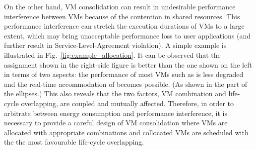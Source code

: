 \documentclass[10pt,journal]{IEEEtran}
\begin{document}
On the other hand, VM consolidation can result in undesirable performance interference between VMs because of the contention in shared resources. This performance interference can stretch the execution durations of VMs to a large extent, which may bring unacceptable performance loss to user applications (and further result in Service-Level-Agreement violation). A simple example is illustrated in Fig.~\ref{fig:example_allocation}. It can be observed that the assignment shown in the right-side figure is better than the one shown on the left in terms of two aspects:  the performance of most VMs such as  is less degraded and  the real-time accommodation of  becomes possible. (As shown in the part of the ellipses.) This also reveals that the two factors, VM combination and life-cycle overlapping, are coupled and mutually affected. Therefore, in order to arbitrate between energy consumption and performance interference, it is necessary to provide a careful design of VM consolidation where VMs are allocated with appropriate combinations and collocated VMs are scheduled with the the most favourable life-cycle overlapping.
\end{document}
